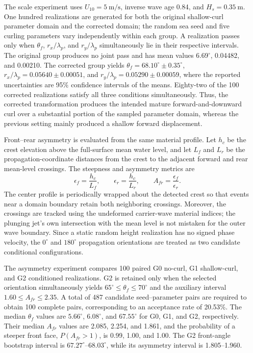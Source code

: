 The scale experiment uses $U_{10}=5~\mathrm{m/s}$, inverse wave age 0.84, and $H_s=0.35~\mathrm{m}$. One hundred realizations are generated for both the original shallow-curl parameter domain and the corrected domain; the random sea seed and five curling parameters vary independently within each group. A realization passes only when $\theta_f$, $r_x/\lambda_p$, and $r_y/\lambda_p$ simultaneously lie in their respective intervals. The original group produces no joint pass and has mean values $6.69^{\circ}$, 0.04482, and 0.00210. The corrected group yields $\theta_f=68.10^{\circ}\pm0.35^{\circ}$, $r_x/\lambda_p=0.05640\pm0.00051$, and $r_y/\lambda_p=0.05290\pm0.00059$, where the reported uncertainties are 95\% confidence intervals of the means. Eighty-two of the 100 corrected realizations satisfy all three conditions simultaneously. Thus, the corrected transformation produces the intended mature forward-and-downward curl over a substantial portion of the sampled parameter domain, whereas the previous setting mainly produced a shallow forward displacement.

Front--rear asymmetry is evaluated from the same material profile. Let $h_c$ be the crest elevation above the full-surface mean water level, and let $L_f$ and $L_r$ be the propagation-coordinate distances from the crest to the adjacent forward and rear mean-level crossings. The steepness and asymmetry metrics are
\begin{equation}
\epsilon_f=\frac{h_c}{L_f},\qquad \epsilon_r=\frac{h_c}{L_r},\qquad A_{fr}=\frac{\epsilon_f}{\epsilon_r}.
\label{eq:front_rear_asymmetry_metrics}
\end{equation}
The center profile is periodically wrapped about the detected crest so that events near a domain boundary retain both neighboring crossings. Moreover, the crossings are tracked using the undeformed carrier-wave material indices; the plunging jet's own intersection with the mean level is not mistaken for the outer wave boundary. Since a static random height realization has no signed phase velocity, the $0^{\circ}$ and $180^{\circ}$ propagation orientations are treated as two candidate conditional configurations.

The asymmetry experiment compares 100 paired G0 no-curl, G1 shallow-curl, and G2 conditioned realizations. G2 is retained only when the selected orientation simultaneously yields $65^{\circ}\leq\theta_f\leq70^{\circ}$ and the auxiliary interval $1.60\leq A_{fr}\leq2.35$. A total of 487 candidate seed--parameter pairs are required to obtain 100 complete pairs, corresponding to an acceptance rate of 20.53\%. The median $\theta_f$ values are $5.66^{\circ}$, $6.08^{\circ}$, and $67.55^{\circ}$ for G0, G1, and G2, respectively. Their median $A_{fr}$ values are 2.085, 2.254, and 1.861, and the probability of a steeper front face, $P(A_{fr}>1)$, is 0.99, 1.00, and 1.00. The G2 front-angle bootstrap interval is $67.27^{\circ}$--$68.03^{\circ}$, while its asymmetry interval is 1.805--1.960.

